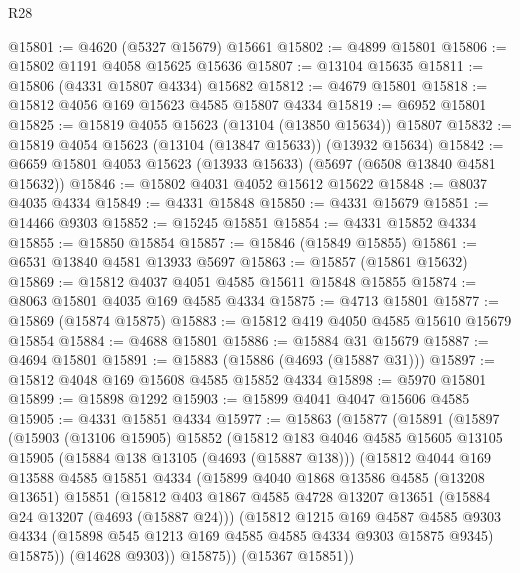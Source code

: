 \begin{lexlean}{R28}
\begin{coremodule}
@15801 := @4620 (@5327 @15679) @15661
@15802 := @4899 @15801
@15806 := @15802 @1191 @4058 @15625 @15636
@15807 := @13104 @15635
@15811 := @15806 (@4331 @15807 @4334) @15682
@15812 := @4679 @15801
@15818 := @15812 @4056 @169 @15623 @4585 @15807 @4334
@15819 := @6952 @15801
@15825 := @15819 @4055 @15623 (@13104 (@13850 @15634)) @15807
@15832 := @15819 @4054 @15623 (@13104 (@13847 @15633)) (@13932 @15634)
@15842 := @6659 @15801 @4053 @15623 (@13933 @15633) (@5697 (@6508 @13840 @4581 @15632))
@15846 := @15802 @4031 @4052 @15612 @15622
@15848 := @8037 @4035 @4334
@15849 := @4331 @15848
@15850 := @4331 @15679
@15851 := @14466 @9303
@15852 := @15245 @15851
@15854 := @4331 @15852 @4334
@15855 := @15850 @15854
@15857 := @15846 (@15849 @15855)
@15861 := @6531 @13840 @4581 @13933 @5697
@15863 := @15857 (@15861 @15632)
@15869 := @15812 @4037 @4051 @4585 @15611 @15848 @15855
@15874 := @8063 @15801 @4035 @169 @4585 @4334
@15875 := @4713 @15801
@15877 := @15869 (@15874 @15875)
@15883 := @15812 @419 @4050 @4585 @15610 @15679 @15854
@15884 := @4688 @15801
@15886 := @15884 @31 @15679
@15887 := @4694 @15801
@15891 := @15883 (@15886 (@4693 (@15887 @31)))
@15897 := @15812 @4048 @169 @15608 @4585 @15852 @4334
@15898 := @5970 @15801
@15899 := @15898 @1292
@15903 := @15899 @4041 @4047 @15606 @4585
@15905 := @4331 @15851 @4334
@15977 := @15863
    (@15877
      (@15891
        (@15897
          (@15903
            (@13106 @15905)
            @15852
            (@15812
              @183
              @4046
              @4585
              @15605
              @13105
              @15905
              (@15884 @138 @13105 (@4693 (@15887 @138)))
              (@15812
                @4044
                @169
                @13588
                @4585
                @15851
                @4334
                (@15899
                  @4040
                  @1868
                  @13586
                  @4585
                  (@13208 @13651)
                  @15851
                  (@15812
                    @403
                    @1867
                    @4585
                    @4728
                    @13207
                    @13651
                    (@15884 @24 @13207 (@4693 (@15887 @24)))
                    (@15812
                      @1215
                      @169
                      @4587
                      @4585
                      @9303
                      @4334
                      (@15898 @545 @1213 @169 @4585 @4585 @4334 @9303 @15875 @9345)
                      @15875))
                  (@14628 @9303))
                @15875))
            (@15367 @15851))

\end{coremodule}
\end{lexlean}
